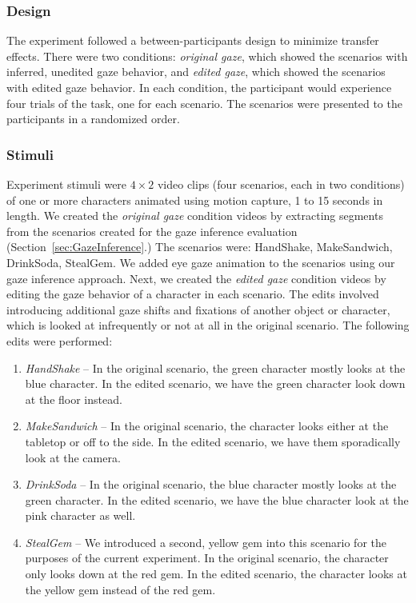 \subsubsection{Design}

The experiment followed a between-participants design to minimize transfer effects. There were two conditions: \emph{original gaze}, which showed the scenarios with inferred, unedited gaze behavior, and \emph{edited gaze}, which showed the scenarios with edited gaze behavior. In each condition, the participant would experience four trials of the task, one for each scenario. The scenarios were presented to the participants in a randomized order.

\subsubsection{Stimuli}

Experiment stimuli were $4 \times 2$ video clips (four scenarios, each in two conditions) of one or more characters animated using motion capture, 1 to 15 seconds in length. We created the \emph{original gaze} condition videos by extracting segments from the scenarios created for the gaze inference evaluation (Section~\ref{sec:GazeInference}.) The scenarios were: HandShake, MakeSandwich, DrinkSoda, StealGem. We added eye gaze animation to the scenarios using our gaze inference approach. Next, we created the \emph{edited gaze} condition videos by editing the gaze behavior of a character in each scenario. The edits involved introducing additional gaze shifts and fixations of another object or character, which is looked at infrequently or not at all in the original scenario. The following edits were performed:

\begin{enumerate}
\item \emph{HandShake} -- In the original scenario, the green character mostly looks at the blue character. In the edited scenario, we have the green character look down at the floor instead.
\item \emph{MakeSandwich} -- In the original scenario, the character looks either at the tabletop or off to the side. In the edited scenario, we have them sporadically look at the camera.
\item \emph{DrinkSoda} -- In the original scenario, the blue character mostly looks at the green character. In the edited scenario, we have the blue character look at the pink character as well.
\item \emph{StealGem} -- We introduced a second, yellow gem into this scenario for the purposes of the current experiment. In the original scenario, the character only looks down at the red gem. In the edited scenario, the character looks at the yellow gem instead of the red gem.
\end{enumerate}

